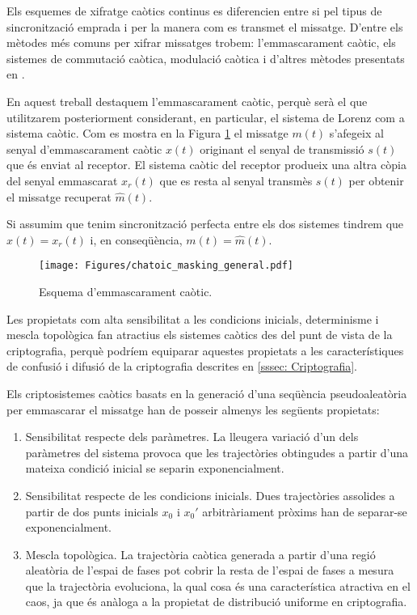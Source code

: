 \documentclass[11pt,a4paper,openright,oneside]{article}
\numberwithin{equation}{section}
\theoremstyle{definition}
\begin{document}
Els esquemes de xifratge caòtics continus es diferencien entre si pel tipus de sincronització emprada i per la manera com es transmet el missatge. D'entre els mètodes més comuns per xifrar missatges trobem: l'emmascarament caòtic, els sistemes de commutació caòtica, modulació caòtica i d'altres mètodes presentats en \cite{Alvarez}. 

En aquest treball destaquem l'emmascarament caòtic, perquè serà el que utilitzarem posteriorment considerant, en particular, el sistema de Lorenz com a sistema caòtic. Com es mostra en la Figura \ref{fig:chaotic_masking_general} el missatge $m(t)$ s'afegeix al senyal d'emmascarament caòtic $x(t)$ originant el senyal de transmissió $s(t)$ que és enviat al receptor. El sistema caòtic del receptor produeix una altra còpia del senyal emmascarat $x_r(t)$ que es resta al senyal transmès $s(t)$ per obtenir el missatge recuperat $\hat{m}(t)$.

Si assumim que tenim sincronització perfecta entre els dos sistemes tindrem que $x(t)=x_r(t)$ i, en conseqüència, $m(t)=\hat{m}(t)$.

\begin{figure}[htbp]
    \centering
    \texttt{[image: Figures/chatoic\_masking\_general.pdf]}
    \caption{Esquema d'emmascarament caòtic.}
    \label{fig:chaotic_masking_general}
\end{figure}

Les propietats com alta sensibilitat a les condicions inicials, determinisme i mescla topològica fan atractius els sistemes caòtics des del punt de vista de la criptografia, perquè podríem equiparar aquestes propietats a les característiques de confusió i difusió de la criptografia descrites en \eqref{sssec: Criptografia}.

Els criptosistemes caòtics basats en la generació d'una seqüència pseudoaleatòria per emmascarar el missatge han de posseir almenys les següents propietats:

\begin{enumerate}
    \item Sensibilitat respecte dels paràmetres. La lleugera variació d'un dels paràmetres del sistema provoca que les trajectòries obtingudes a partir d'una mateixa condició inicial se separin exponencialment.
    
    \item Sensibilitat respecte de les condicions inicials. Dues trajectòries assolides a partir de dos punts inicials $x_0$ i $x_0'$ arbitràriament pròxims han de separar-se exponencialment.
    
    \item Mescla topològica. La trajectòria caòtica generada a partir d'una regió aleatòria de l'espai de fases pot cobrir la resta de l'espai de fases a mesura que la trajectòria evoluciona, la qual cosa és una característica atractiva en el caos, ja que és anàloga a la propietat de distribució uniforme en criptografia.
\end{enumerate}
\end{document}
